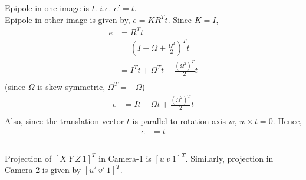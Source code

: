 \documentclass{article}
\begin{document}
\subsubsection{}
Epipole in one image is $t$.  $i.e.$ $e' = t$. \\

Epipole in other image is given by, $e = K R^T t$. Since $K = I$,
\begin{align*}
e &= R^T t \\
&= ( I + \Omega + \frac{\Omega^2}{2} )^T t \\
&= I^T t + \Omega^T t + \frac{(\Omega^2)^T}{2}  t  \\
\end{align*}
(since $\Omega$ is skew symmetric, $\Omega^T = - \Omega$) \\
\begin{align*}
e &= I t - \Omega t + \frac{(\Omega^2)^T}{2} t  \\
\end{align*}
Also, since the translation vector $t$ is parallel to rotation axis $w$, $w \times t = 0$. Hence,
\begin{align*}
e &= t  \\
\end{align*}


\subsubsection{}
Projection of $[X\ Y\ Z\ 1]^T$ in Camera-1 is $[u\ v\ 1]^T$. Similarly, projection in Camera-2 is given by $[u'\ v'\ 1]^T$.
\end{document}
